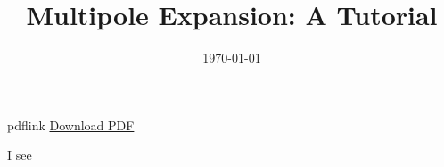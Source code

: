 \documentclass[11pt]{article}
\title{Multipole Expansion: A Tutorial}
\author{}
\date{\today}
\begin{document}
\maketitle
\begin{warpHTML}
\begin{BlockClass}{pdflink}
\href{multipole.pdf}{Download PDF}
\end{BlockClass}
\end{warpHTML}
\tableofcontents

I see
\end{document}

